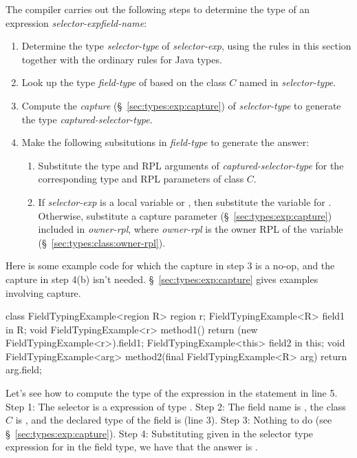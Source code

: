 The compiler carries out the following steps to determine the type of
an expression \emph{selector-exp}\emph{field-name}:
%
\begin{enumerate}
%
\item Determine the type \emph{selector-type} of \emph{selector-exp}, using the rules in
  this section together with the ordinary rules for Java types.
%
\item Look up the type \emph{field-type} of  based on the
  class $C$ named in \emph{selector-type}.
%
\item Compute the \emph{capture} (\S~\ref{sec:types:exp:capture}) of
  \emph{selector-type} to generate the type
  \emph{captured-selector-type}.
%
\item Make the following subsitutions in \emph{field-type} to generate
  the answer:
%
\begin{enumerate}
%
\item Substitute the type and RPL arguments of
  \emph{captured-selector-type} for the corresponding type and RPL
  parameters of class $C$.
%
\item If \emph{selector-exp} is a  local variable or
  , then substitute the variable for .  Otherwise,
  substitute a capture parameter (\S~\ref{sec:types:exp:capture})
  included in \emph{owner-rpl}\kwd{:*}, where \emph{owner-rpl} is the
  owner RPL of the variable (\S~\ref{sec:types:class:owner-rpl}).
%
\end{enumerate}
%
\end{enumerate}

Here is some example code for which the capture in step 3 is a no-op,
and the capture in step 4(b) isn't needed.
\S~\ref{sec:types:exp:capture} gives examples involving capture.
%
\begin{numbereddpjlisting}
class FieldTypingExample<region R> {
    region r;
    FieldTypingExample<R> field1 in R;
    void FieldTypingExample<r> method1() {
        return (new FieldTypingExample<r>).field1;
    }        
    FieldTypingExample<this> field2 in this;
    void FieldTypingExample<arg> 
      method2(final FieldTypingExample<R> arg) {
        return arg.field;
    }
}
\end{numbereddpjlisting}
%

Let's see how to compute the type of the expression in the
 statement in line 5.  Step 1: The selector is a 
expression of type .  Step 2: The field
name is , the class $C$ is , and
the declared type of the field is  (line
3).  Step 3: Nothing to do (see \S~\ref{sec:types:exp:capture}).  Step
4: Substituting  given in the selector type expression for
 in the field type, we have that the answer is
.

